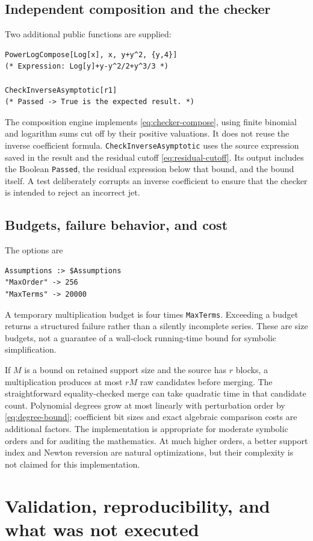 \documentclass[11pt,a4paper]{article}
\numberwithin{equation}{section}
\theoremstyle{definition}\newtheorem{definition}[theorem]{Definition}
\theoremstyle{remark}\newtheorem{remark}[theorem]{Remark}
\DeclareRobustCommand{\code}[1]{{\small\ttfamily\urlstyle{same}\nolinkurl{#1}}}
\begin{document}
\subsection{Independent composition and the checker}
Two additional public functions are supplied:
\begin{lstlisting}
PowerLogCompose[Log[x], x, y+y^2, {y,4}]
(* Expression: Log[y]+y-y^2/2+y^3/3 *)

CheckInverseAsymptotic[r1]
(* Passed -> True is the expected result. *)
\end{lstlisting}
The composition engine implements \eqref{eq:checker-compose}, using finite
binomial and logarithm sums cut off by their positive valuations. It does
not reuse the inverse coefficient formula. \code{CheckInverseAsymptotic}
uses the source expression saved in the result and the residual cutoff
\eqref{eq:residual-cutoff}. Its output includes the Boolean
\code{Passed}, the residual expression below that bound, and the bound
itself. A test deliberately corrupts an inverse coefficient to ensure that
the checker is intended to reject an incorrect jet.

\subsection{Budgets, failure behavior, and cost}
The options are
\begin{lstlisting}
Assumptions :> $Assumptions
"MaxOrder" -> 256
"MaxTerms" -> 20000
\end{lstlisting}
A temporary multiplication budget is four times \code{MaxTerms}. Exceeding
a budget returns a structured failure rather than a silently incomplete
series. These are size budgets, not a guarantee of a wall-clock running-time
bound for symbolic simplification.

If \(M\) is a bound on retained support size and the source has \(r\) blocks,
a multiplication produces at most \(rM\) raw candidates before merging.
The straightforward equality-checked merge can take quadratic time in that
candidate count. Polynomial degrees grow at most linearly with perturbation
order by \eqref{eq:degree-bound}; coefficient bit sizes and exact algebraic
comparison costs are additional factors. The implementation is appropriate
for moderate symbolic orders and for auditing the mathematics. At much
higher orders, a better support index and Newton reversion are natural
optimizations, but their complexity is not claimed for this implementation.

\section{Validation, reproducibility, and what was not executed}
\label{sec:validation}
\end{document}
